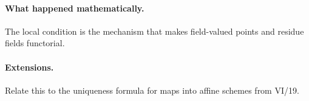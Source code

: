 \paragraph{What happened mathematically.}
The local condition is the mechanism that makes field-valued points and residue fields functorial.

\paragraph{Extensions.}
Relate this to the uniqueness formula for maps into affine schemes from VI/19.
\fi
